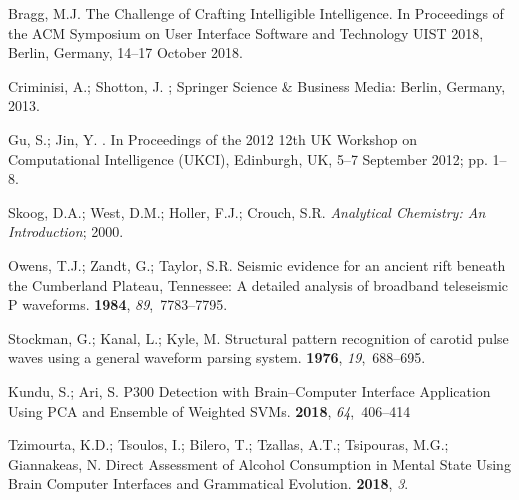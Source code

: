 \documentclass[brainsci,article,accept,moreauthors,pdftex,10pt,a4paper]{mdpi}
\begin{document}
\begin{thebibliography}{-------}
Bragg, M.J.
\newblock The Challenge of Crafting Intelligible Intelligence.
\newblock  In Proceedings of the ACM Symposium on User Interface Software and Technology UIST 2018, Berlin, Germany, 14--17 October 2018.

Criminisi, A.; Shotton, J.
; Springer Science \& Business Media: Berlin, Germany, 2013.

Gu, S.; Jin, Y.
.
\newblock  In Proceedings of the 2012 12th UK Workshop on Computational Intelligence (UKCI),  Edinburgh, UK, 5--7 September 2012; pp. 1--8.

Skoog, D.A.; West, D.M.; Holler, F.J.; Crouch, S.R.
\newblock\emph{ Analytical Chemistry: An Introduction};
 {2000}.

Owens, T.J.; Zandt, G.; Taylor, S.R.
\newblock Seismic evidence for an ancient rift beneath the Cumberland Plateau,
  Tennessee: A detailed analysis of broadband teleseismic P waveforms.
 {\bf 1984}, {\em
  89},~7783--7795.

Stockman, G.; Kanal, L.; Kyle, M.
\newblock Structural pattern recognition of carotid pulse waves using a general
  waveform parsing system.
 {\bf 1976}, {\em 19},~688--695.


Kundu, S.; Ari, S.
\newblock P300 Detection with Brain–Computer Interface Application Using PCA
  and Ensemble of Weighted SVMs.
 {\bf 2018}, {\em 64},~406--414
  
Tzimourta, K.D.; Tsoulos, I.; Bilero, T.; Tzallas, A.T.; Tsipouras, M.G.;
  Giannakeas, N.
\newblock Direct Assessment of Alcohol Consumption in Mental State Using Brain
  Computer Interfaces and Grammatical Evolution.
 {\bf 2018}, {\em 3}.


\end{thebibliography}
\end{document}
